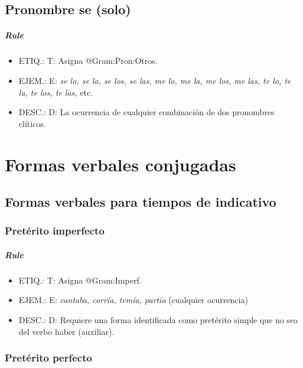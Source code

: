 \documentclass[11pt]{report}
\begin{document}
\section{Pronombre se (solo)}
\paragraph*{Rule}
\begin{itemize}
\item ETIQ.:  T: Asigna @Gram:Pron:Otros.
\item EJEM.:  E: \emph{se lo, se la, se los, se las, me lo, me la, me los, me las, te lo, te la, te los, te las,} etc.
\item DESC.:  D: La ocurrencia de cualquier combinación de dos pronombres clíticos.
\end{itemize}

\chapter{Formas verbales conjugadas}
\section{Formas verbales para tiempos de indicativo}
\subsection{Pretérito imperfecto}
\paragraph*{Rule}
\begin{itemize}
\item ETIQ.:  T: Asigna @Gram:Imperf.
\item EJEM.:  E: \emph{cantaba, corría, temía, partía} (cualquier ocurrencia)
\item DESC.:  D: Requiere una forma identificada como pretérito simple que no sea del verbo haber (auxiliar).
\end{itemize}

\subsection{Pretérito perfecto}
\end{document}
